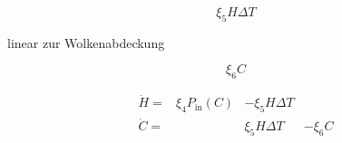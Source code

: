 \begin{refsection}
\begin{equation}
\xi_5 H \Delta T
\end{equation}


linear zur Wolkenabdeckung

\begin{equation}
\xi_6 C
\end{equation}


\begin{equation}
	\begin{matrix}			
		\dot{H} = & \xi_4 P_{\text{in}}(C) & - \xi_5 H \Delta T & \\
		\dot{C} = &                       &   \xi_5 H \Delta T & - \xi_6 C
	\end{matrix}	
\end{equation}


%
%
%
%
%
%
%
%
%
%


\end{refsection}
